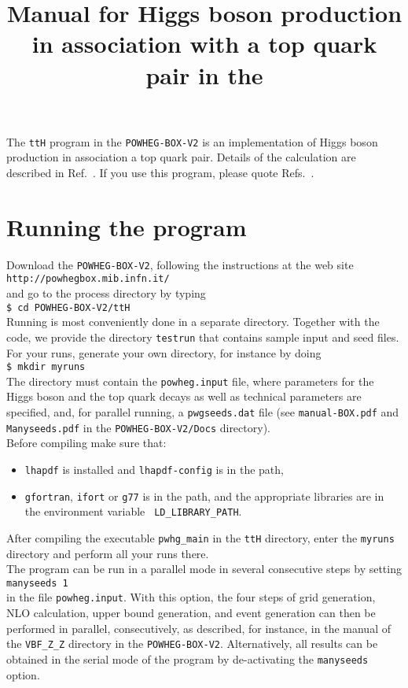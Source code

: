 \documentclass[a4paper,11pt]{article}
\title{Manual for  Higgs boson production in association with a top quark pair in the \POWHEGBOXV{}}
\date{}
\newcommand\POWHEGBOXV{{\tt POWHEG-BOX-V2}}
\begin{document}
\maketitle
%
\noindent
The {\tt ttH} program in the \POWHEGBOXV{} is an implementation of Higgs boson production in association a top quark pair. Details of the calculation are described in Ref.~\cite{HJRW}. If you use this program, please quote Refs.~\cite{HJRW,DORW,DJORW,Alioli:2010xd}.
%
\section*{Running the program}
%
Download the \POWHEGBOXV{}, following the instructions at the web site 
\\[2ex]
{\tt http://powhegbox.mib.infn.it/}
\\[2ex] 
and go to the process directory by typing 
\\[2ex]
{\tt \$ cd \POWHEGBOXV/ttH}  
\\[2ex]
Running is most conveniently done in a separate directory. Together with the code, we provide the directory {\tt testrun} that contains sample input and seed files. 
\\[2ex]
For your runs, generate your own directory, for instance by doing 
\\[2ex]
{\tt \$ mkdir myruns}
\\[2ex]
The directory must contain the {\tt powheg.input} file, where parameters for the Higgs boson and the top quark decays as well as technical  parameters are specified, and, for
parallel running, a {\tt pwgseeds.dat} file (see {\tt manual-BOX.pdf}
and {\tt Manyseeds.pdf} in the  {\tt POWHEG-BOX-V2/Docs} directory).
\\[2ex]
Before compiling make sure that:
\begin{itemize}
\item 
{\tt lhapdf} is installed and {\tt lhapdf-config} is in the path,
\item
{\tt gfortran}, {\tt ifort} or {\tt g77} is in the path, and the
appropriate libraries are in the environment variable {\tt
  LD\_LIBRARY\_PATH}. 
\end{itemize}
After compiling the executable {\tt pwhg\_main} in the {\tt ttH} directory, enter the {\tt myruns} directory and perform all your runs there. 
\\[2ex]
The program can be run in a parallel mode in several consecutive steps by setting 
\\[2ex]
{\tt manyseeds   1}
\\[2ex]
in the file  {\tt powheg.input}.  With this option, the four steps of grid generation, NLO calculation, upper bound generation, and event generation can then be performed in parallel, consecutively, as described, for instance, in the manual of the {\tt VBF\_Z\_Z} directory in the \POWHEGBOXV{}. Alternatively, all results can be obtained in the serial mode of the program by de-activating the  {\tt manyseeds} option. 
\end{document}
